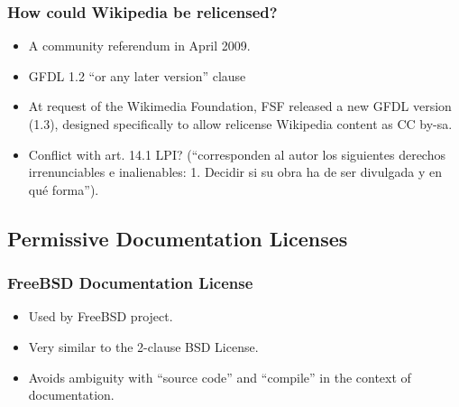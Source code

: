 \documentclass{beamer}
\begin{document}

\begin{frame}
\frametitle {How could Wikipedia be relicensed?}

\pause

\begin{itemize}
\item A community referendum in April 2009.
\item GFDL 1.2 ``\alert{or} any later version'' clause
\item At request of the Wikimedia Foundation, FSF released a new GFDL version (1.3), designed
specifically to allow relicense Wikipedia content as CC by-sa.
\item Conflict with art. 14.1 LPI? (``corresponden al autor los siguientes derechos irrenunciables e \alert{inalienables}: 1. Decidir si su obra ha de ser divulgada y en qué forma'').
\end{itemize}

\end{frame}



\subsection{Permissive Documentation Licenses}

\begin{frame}
\frametitle {FreeBSD Documentation License}

\begin{itemize}
\item Used by FreeBSD project.
\item Very similar to the 2-clause BSD License.
\item Avoids ambiguity with ``source code'' and ``compile'' in the context of documentation.
\end{itemize}

\end{frame}

\end{document}
